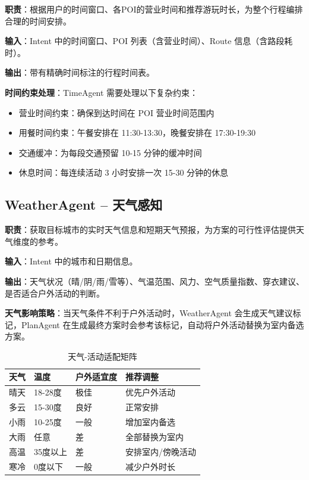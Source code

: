 \documentclass[12pt,a4paper]{ctexart}
\begin{document}
\textbf{职责}：根据用户的时间窗口、各POI的营业时间和推荐游玩时长，为整个行程编排合理的时间安排。

\textbf{输入}：Intent 中的时间窗口、POI 列表（含营业时间）、Route 信息（含路段耗时）。

\textbf{输出}：带有精确时间标注的行程时间表。

\textbf{时间约束处理}：TimeAgent 需要处理以下复杂约束：
\begin{itemize}[leftmargin=2em]
  \item 营业时间约束：确保到达时间在 POI 营业时间范围内
  \item 用餐时间约束：午餐安排在 11:30-13:30，晚餐安排在 17:30-19:30
  \item 交通缓冲：为每段交通预留 10-15 分钟的缓冲时间
  \item 休息时间：每连续活动 3 小时安排一次 15-30 分钟的休息
\end{itemize}

\subsection{WeatherAgent -- 天气感知}

\textbf{职责}：获取目标城市的实时天气信息和短期天气预报，为方案的可行性评估提供天气维度的参考。

\textbf{输入}：Intent 中的城市和日期信息。

\textbf{输出}：天气状况（晴/阴/雨/雪等）、气温范围、风力、空气质量指数、穿衣建议、是否适合户外活动的判断。

\textbf{天气影响策略}：当天气条件不利于户外活动时，WeatherAgent 会生成天气建议标记，PlanAgent 在生成最终方案时会参考该标记，自动将户外活动替换为室内备选方案。

\begin{table}[H]
\centering
\caption{天气-活动适配矩阵}
\label{tab:weather-matrix}
\renewcommand{\arraystretch}{1.3}
\begin{tabular}{p{2cm} p{2cm} p{3cm} p{5cm}}
\toprule
\textbf{天气} & \textbf{温度} & \textbf{户外适宜度} & \textbf{推荐调整} \\
\midrule
晴天 & 18-28度 & 极佳 & 优先户外活动 \\
多云 & 15-30度 & 良好 & 正常安排 \\
小雨 & 10-25度 & 一般 & 增加室内备选 \\
大雨 & 任意 & 差 & 全部替换为室内 \\
高温 & 35度以上 & 差 & 安排室内/傍晚活动 \\
寒冷 & 0度以下 & 一般 & 减少户外时长 \\
\bottomrule
\end{tabular}
\end{table}
\end{document}
